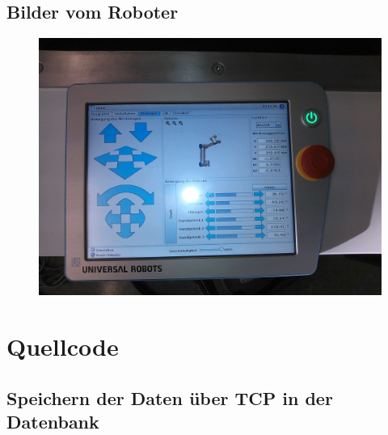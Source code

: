 \section{Bilder vom Roboter}
\label{pic_of_robot}

\begin{figure}[H]
  \centering
    \includegraphics[width=1\textwidth]{pic/tablet.jpg}
      \caption[Soll und Ist Werte der Position des 2.Gelenks]{}
      \label{fig:joint_1_position_capi}
\end{figure}


\chapter{Quellcode}
\label{quellcode}

\section{Speichern der Daten über TCP in der Datenbank}
\label{save_data_tcp_code_gru}

